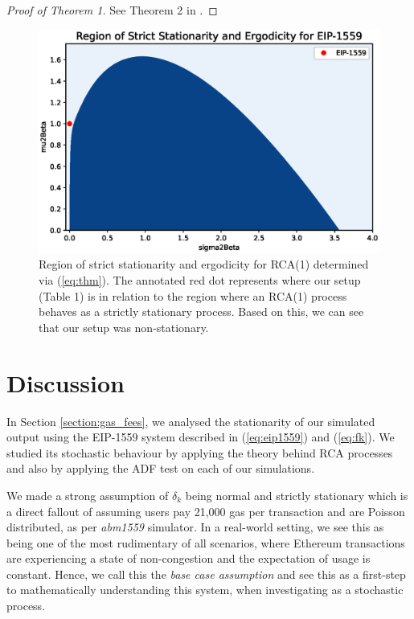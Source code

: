 \documentclass[futureinternet,article,submit,moreauthors,dvi2pdf]{mdpi}
\begin{document}
\begin{proof}[Proof of Theorem 1]
See Theorem 2 in \cite{Wan03}.
\end{proof}

\begin{figure}
\centering
\includegraphics[width = 12 cm]{strict_stationarity.eps}
\caption{Region of strict stationarity and ergodicity for RCA(1) determined via (\ref{eq:thm}). The annotated red dot represents where our setup (Table 1) is in relation to the region where an RCA(1) process behaves as a strictly stationary process. Based on this, we can see that our setup was non-stationary.} 
\label{fig:strict_stationarity}
\end{figure}  

\section{Discussion}
\label{section:discussion}

In Section \ref{section:gas_fees}, we analysed  the stationarity of our simulated output using the EIP-1559 system described in (\ref{eq:eip1559}) and (\ref{eq:fk}). We studied its stochastic behaviour by applying the theory behind RCA processes and  also by applying the ADF test on each of our simulations. 

We made a strong assumption of $\delta_{k}$ being normal and strictly stationary which is a direct fallout of assuming users pay 21,000 gas per transaction and are Poisson distributed, as per \textit{abm1559} simulator. In a real-world setting, we see this as being one of the most rudimentary of all scenarios, where Ethereum transactions are experiencing a state of non-congestion and the expectation of usage is constant. Hence, we call this the \textit{base case assumption} and see this as a first-step to mathematically understanding this system, when investigating as a stochastic process. 
\end{document}
